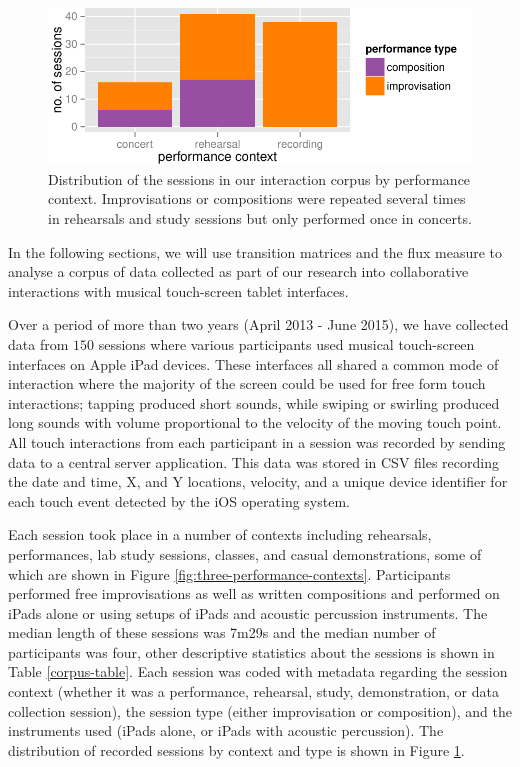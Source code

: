 \documentclass{sigchi}
\begin{document}
\begin{figure}
  \centering
  \includegraphics[width=\linewidth]{figures/sessions-count}
  \caption{Distribution of the sessions in our interaction corpus by
    performance context. Improvisations or compositions were repeated
    several times in rehearsals and study sessions but only performed
    once in concerts.
    \label{fig:count-data}}
\end{figure}


In the following sections, we will use transition matrices and the
flux measure to analyse a corpus of data collected as part of our research
into collaborative interactions with musical touch-screen tablet
interfaces. 

Over a period of more than two years (April 2013 - June 2015), we have
collected data from $150$ sessions where various participants used
musical touch-screen interfaces on Apple iPad devices. These
interfaces all shared a common mode of interaction where the majority
of the screen could be used for free form touch interactions; tapping
produced short sounds, while swiping or swirling produced long sounds
with volume proportional to the velocity of the moving touch point.
All touch interactions from each participant in a session was recorded
by sending data to a central server application. This data was stored
in CSV files recording the date and time, X, and Y locations,
velocity, and a unique device identifier for each touch event detected
by the iOS operating system.

Each session took place in a number of contexts including rehearsals,
performances, lab study sessions, classes, and casual demonstrations,
some of which are shown in Figure
\ref{fig:three-performance-contexts}. Participants performed free
improvisations as well as written compositions and performed on iPads
alone or using setups of iPads and acoustic percussion instruments.
The median length of these sessions was 7m29s and the median number of
participants was four, other descriptive statistics about the sessions
is shown in Table \ref{corpus-table}. Each session was coded with
metadata regarding the session context (whether it was a performance,
rehearsal, study, demonstration, or data collection session), the
session type (either improvisation or composition), and the
instruments used (iPads alone, or iPads with acoustic percussion). The
distribution of recorded sessions by context and type is shown in
Figure \ref{fig:count-data}.
\end{document}
